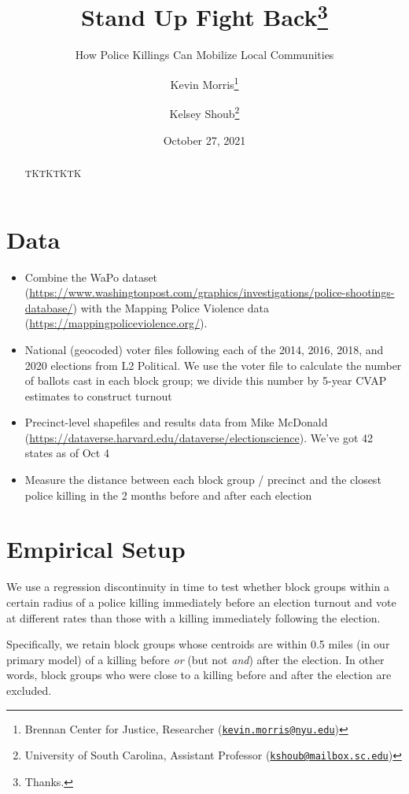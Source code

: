 \documentclass[
  12pt,
]{article}
\title{Stand Up Fight Back\thanks{Thanks.}}
\subtitle{How Police Killings Can Mobilize Local Communities}
\author{Kevin Morris\footnote{Brennan Center for Justice, Researcher (\href{mailto:kevin.morris@nyu.edu}{\nolinkurl{kevin.morris@nyu.edu}})} \and Kelsey Shoub\footnote{University of South Carolina, Assistant Professor (\href{mailto:kshoub@mailbox.sc.edu}{\nolinkurl{kshoub@mailbox.sc.edu}})}}
\date{October 27, 2021}
\begin{document}
\maketitle
\begin{abstract}
TKTKTKTK
\end{abstract}

\pagebreak
\doublespacing


\hypertarget{data}{%
\section*{Data}\label{data}}

\begin{itemize}
\item
  Combine the WaPo dataset (\url{https://www.washingtonpost.com/graphics/investigations/police-shootings-database/}) with the Mapping Police Violence data (\url{https://mappingpoliceviolence.org/}).
\item
  National (geocoded) voter files following each of the 2014, 2016, 2018, and 2020 elections from L2 Political. We use the voter file to calculate the number of ballots cast in each block group; we divide this number by 5-year CVAP estimates to construct turnout
\item
  Precinct-level shapefiles and results data from Mike McDonald (\url{https://dataverse.harvard.edu/dataverse/electionscience}). We've got 42 states as of Oct 4
\item
  Measure the distance between each block group / precinct and the closest police killing in the 2 months before and after each election
\end{itemize}

\hypertarget{empirical-setup}{%
\section*{Empirical Setup}\label{empirical-setup}}

We use a regression discontinuity in time to test whether block groups within a certain radius of a police killing immediately before an election turnout and vote at different rates than those with a killing immediately following the election.

Specifically, we retain block groups whose centroids are within 0.5 miles (in our primary model) of a killing before \emph{or} (but not \emph{and}) after the election. In other words, block groups who were close to a killing before and after the election are excluded.
\end{document}
